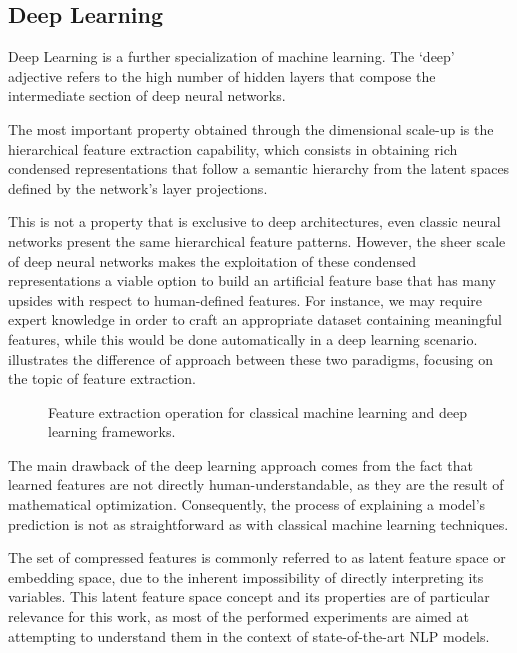 \subsection{Deep Learning}

Deep Learning is a further specialization of machine learning.
The `deep' adjective refers to the high number of hidden layers that compose the intermediate section of deep neural networks.

The most important property obtained through the dimensional scale-up is the hierarchical feature extraction capability, which consists in obtaining rich condensed representations that follow a semantic hierarchy from the latent spaces defined by the network's layer projections.

This is not a property that is exclusive to deep architectures, even classic neural networks present the same hierarchical feature patterns.
However, the sheer scale of deep neural networks makes the exploitation of these condensed representations a viable option to build an artificial feature base that has many upsides with respect to human-defined features.
For instance, we may require expert knowledge in order to craft an appropriate dataset containing meaningful features, while this would be done automatically in a deep learning scenario.
 illustrates the difference of approach between these two paradigms, focusing on the topic of feature extraction.

\begin{figure}[t!]
    \centering
    \quad
    \caption{Feature extraction operation for classical machine learning and deep learning frameworks.}
    \label{fig:background_fex_deep-fex}
\end{figure}

The main drawback of the deep learning approach comes from the fact that learned features are not directly human-understandable, as they are the result of mathematical optimization.
Consequently, the process of explaining a model's prediction is not as straightforward as with classical machine learning techniques.

The set of compressed features is commonly referred to as latent feature space or embedding space, due to the inherent impossibility of directly interpreting its variables.
This latent feature space concept and its properties are of particular relevance for this work, as most of the performed experiments are aimed at attempting to understand them in the context of state-of-the-art NLP models.

